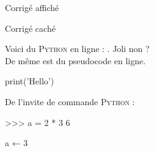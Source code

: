 \documentclass[a4paper,12pt,french]{book}
\begin{document}
\afficheEnonce


\afficheCorrige
\begin{corrige}
\begin{encadre}[Réponse]
	Corrigé affiché
\end{encadre}
\end{corrige}

\cacheCorrige
\begin{corrige}
\begin{encadre}[Réponse]
		Corrigé caché
\end{encadre}
\end{corrige}

\newpage

Voici du \textsc{Python} en ligne : . Joli non ?\\

De même  est du pseudocode en ligne.

\begin{pythoncode}
print('Hello')
\end{pythoncode}

De l'invite de commande \textsc{Python} :

\begin{pythonshell}
>>> a = 2 * 3
6
\end{pythonshell}

\begin{algo}
a ← 3
\end{algo}
\end{document}
